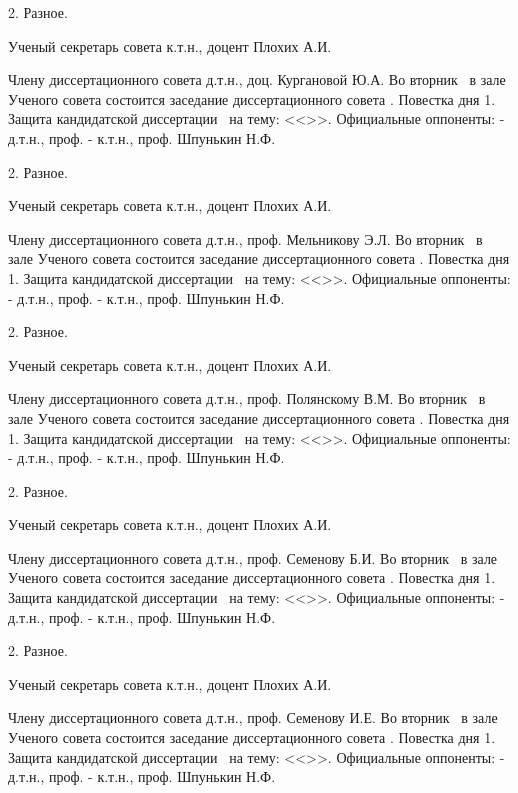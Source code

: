 2.	Разное.

Ученый секретарь совета
к.т.н., доцент		Плохих А.И. 



Члену диссертационного совета
д.т.н., доц. Кургановой Ю.А.
Во вторник \ в зале Ученого совета состоится заседание диссертационного совета .
Повестка дня
1.	Защита кандидатской диссертации \thesisAuthorLastNameKemFull\ на тему: <<\thesisTitle>>.
Официальные оппоненты:	- д.т.н., проф.	\opponentOneFioShort
- к.т.н., проф.	Шпунькин Н.Ф.

2.	Разное.

Ученый секретарь совета
к.т.н., доцент		Плохих А.И. 



Члену диссертационного совета
д.т.н., проф. Мельникову Э.Л.
Во вторник \ в зале Ученого совета состоится заседание диссертационного совета .
Повестка дня
1.	Защита кандидатской диссертации \thesisAuthorLastNameKemFull\ на тему: <<\thesisTitle>>.
Официальные оппоненты:	- д.т.н., проф.	\opponentOneFioShort
- к.т.н., проф.	Шпунькин Н.Ф.

2.	Разное.

Ученый секретарь совета
к.т.н., доцент		Плохих А.И. 



Члену диссертационного совета
д.т.н., проф. Полянскому В.М.
Во вторник \ в зале Ученого совета состоится заседание диссертационного совета .
Повестка дня
1.	Защита кандидатской диссертации \thesisAuthorLastNameKemFull\ на тему: <<\thesisTitle>>.
Официальные оппоненты:	- д.т.н., проф.	\opponentOneFioShort
- к.т.н., проф.	Шпунькин Н.Ф.

2.	Разное.

Ученый секретарь совета
к.т.н., доцент		Плохих А.И. 



Члену диссертационного совета
д.т.н., проф. Семенову Б.И.
Во вторник \ в зале Ученого совета состоится заседание диссертационного совета .
Повестка дня
1.	Защита кандидатской диссертации \thesisAuthorLastNameKemFull\ на тему: <<\thesisTitle>>.
Официальные оппоненты:	- д.т.н., проф.	\opponentOneFioShort
- к.т.н., проф.	Шпунькин Н.Ф.

2.	Разное.

Ученый секретарь совета
к.т.н., доцент		Плохих А.И. 



Члену диссертационного совета
д.т.н., проф. Семенову И.Е.
Во вторник \ в зале Ученого совета состоится заседание диссертационного совета .
Повестка дня
1.	Защита кандидатской диссертации \thesisAuthorLastNameKemFull\ на тему: <<\thesisTitle>>.
Официальные оппоненты:	- д.т.н., проф.	\opponentOneFioShort
- к.т.н., проф.	Шпунькин Н.Ф.


